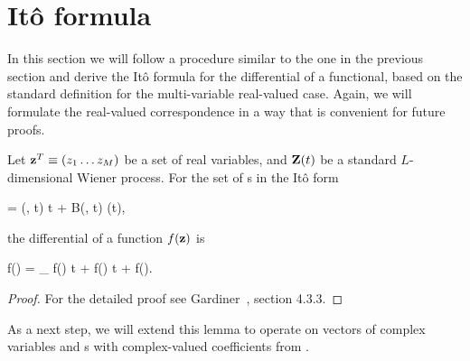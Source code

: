 \section{It\^o formula}

In this section we will follow a procedure similar to the one in the previous section and derive the It\^o formula for the differential of a functional, based on the standard definition for the multi-variable real-valued case.
Again, we will formulate the real-valued correspondence in a way that is convenient for future proofs.

\begin{lemma}
\label{lmm:fpe-sde:ito-formula:ito-f-real}
	Let $\mathbf{z}^T \equiv (z_1 \ldots z_M)$ be a set of real variables, and $\mathbf{Z}(t)$ be a standard $L$-dimensional Wiener process.
	For the set of s in the It\^o form
	\begin{eqn*}
		\upd\zvec = \avec(\zvec, t) \upd t + B(\zvec, t) \upd\Zvec(t),
	\end{eqn*}
	the differential of a function $f(\mathbf{z})$ is
	\begin{eqn*}
		\upd f(\zvec) =
			\avec \cdot \vcwd_{\zvec} f(\zvec) \upd t
			+   f(\zvec) \upd t
			+  f(\zvec).
	\end{eqn*}
\end{lemma}
\begin{proof}
For the detailed proof see Gardiner~\cite{Gardiner1997}, section 4.3.3.
\end{proof}

As a next step, we will extend this lemma to operate on vectors of complex variables and s with complex-valued coefficients from .

